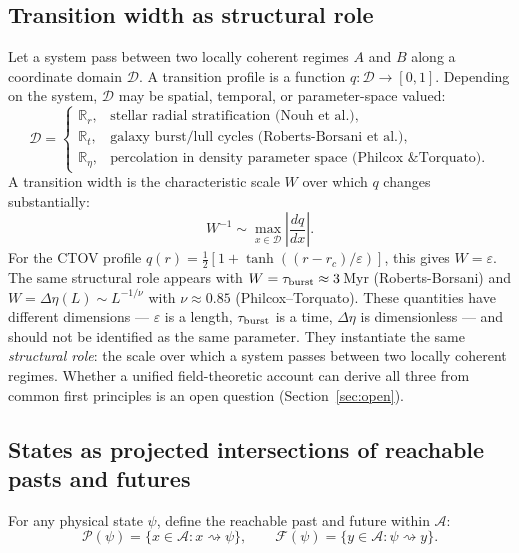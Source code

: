 \documentclass[12pt, oneside]{article}
\begin{document}
\subsection{Transition width as structural role}
\label{sec:transwidth}

Let a system pass between two locally coherent regimes $A$ and $B$ along a coordinate domain $\mathcal{D}$. A transition profile is a function $q : \mathcal{D} \to [0,1]$. Depending on the system, $\mathcal{D}$ may be spatial, temporal, or parameter-space valued:
\[
\mathcal{D} = \begin{cases}
\mathbb{R}_r, & \text{stellar radial stratification (Nouh et al.)}, \\
\mathbb{R}_t, & \text{galaxy burst/lull cycles (Roberts-Borsani et al.)}, \\
\mathbb{R}_\eta, & \text{percolation in density parameter space (Philcox \& Torquato)}.
\end{cases}
\]
A transition width is the characteristic scale $W$ over which $q$ changes substantially:
\[
W^{-1} \sim \max_{x \in \mathcal{D}}\!\left|\frac{dq}{dx}\right|.
\]
For the CTOV profile $q(r) = \tfrac{1}{2}[1 + \tanh((r - r_c)/\varepsilon)]$, this gives $W = \varepsilon$. The same structural role appears with $W = \tau_{\rm burst} \approx 3$\,Myr (Roberts-Borsani) and $W = \Delta\eta(L) \sim L^{-1/\nu}$ with $\nu \approx 0.85$ (Philcox--Torquato). These quantities have different dimensions --- $\varepsilon$ is a length, $\tau_{\rm burst}$ is a time, $\Delta\eta$ is dimensionless --- and should not be identified as the same parameter. They instantiate the same \textit{structural role}: the scale over which a system passes between two locally coherent regimes. Whether a unified field-theoretic account can derive all three from common first principles is an open question (Section~\ref{sec:open}).

\subsection{States as projected intersections of reachable pasts and futures}

For any physical state $\psi$, define the reachable past and future within $\mathcal{A}$:
\[
\mathcal{P}(\psi) = \{x \in \mathcal{A} : x \rightsquigarrow \psi\}, \qquad
\mathcal{F}(\psi) = \{y \in \mathcal{A} : \psi \rightsquigarrow y\}.
\]
\end{document}
